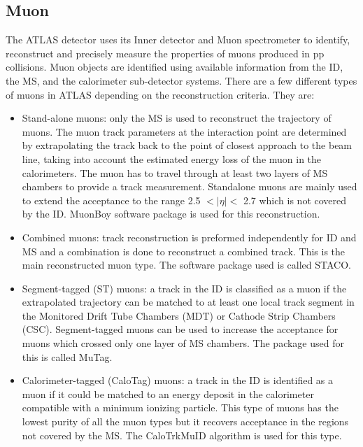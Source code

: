 \subsection{Muon}
The ATLAS detector uses its Inner detector and Muon spectrometer to identify, reconstruct and precisely measure the properties of muons produced in pp collisions. 
Muon objects are identified using available information from the ID, the MS, and the calorimeter sub-detector systems. There are a few different types of muons in ATLAS depending on the reconstruction criteria. They are:
\begin{itemize}
\item Stand-alone muons:  only the MS is used to reconstruct the trajectory of muons. The muon track parameters at the interaction point are determined by extrapolating the track back to the point of closest approach to the beam line, taking into account the estimated energy loss of the muon in the calorimeters. The muon has to travel through at least two layers of MS chambers to provide a track measurement. Standalone muons are mainly used to extend the acceptance to the range 2.5 $< |\eta| <$ 2.7 which is not covered by the ID. MuonBoy software package is used for this reconstruction.
\item Combined muons: track reconstruction is preformed independently for ID and MS and a combination is done to reconstruct a combined track. This is the main reconstructed muon type. The software package used is called STACO.
\item Segment-tagged (ST) muons: a track in the ID is classified as a muon if the extrapolated trajectory can be matched to at least one local track segment in the Monitored Drift Tube Chambers (MDT) or Cathode Strip Chambers (CSC). Segment-tagged muons can be used to increase the acceptance for muons which crossed only one layer of MS chambers. The package used for this is called MuTag. 
\item Calorimeter-tagged (CaloTag) muons: a track in the ID is identified as a muon if it could be matched to an energy deposit in the calorimeter compatible with a minimum ionizing particle. This type of muons has the lowest purity of all the muon types but it recovers acceptance in the regions not covered by the MS. The CaloTrkMuID algorithm is used for this type.
\end{itemize}

